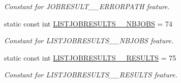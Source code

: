 \begin{DoxyCompactItemize}
\begin{DoxyCompactList}\small\item\em Constant for JOBRESULT\_\-\_\-ERRORPATH feature. \item\end{DoxyCompactList}\item 
\hypertarget{classTMS__Data_1_1TMS__DataPackage_ac68cd5ce0735ac6f33b68d9b6663269e}{
static const int \hyperlink{classTMS__Data_1_1TMS__DataPackage_ac68cd5ce0735ac6f33b68d9b6663269e}{LISTJOBRESULTS\_\-\_\-NBJOBS} = 74}
\label{classTMS__Data_1_1TMS__DataPackage_ac68cd5ce0735ac6f33b68d9b6663269e}

\begin{DoxyCompactList}\small\item\em Constant for LISTJOBRESULTS\_\-\_\-NBJOBS feature. \item\end{DoxyCompactList}\item 
\hypertarget{classTMS__Data_1_1TMS__DataPackage_a07b47ccffd7dac8cf1b4493213ddb32a}{
static const int \hyperlink{classTMS__Data_1_1TMS__DataPackage_a07b47ccffd7dac8cf1b4493213ddb32a}{LISTJOBRESULTS\_\-\_\-RESULTS} = 75}
\label{classTMS__Data_1_1TMS__DataPackage_a07b47ccffd7dac8cf1b4493213ddb32a}

\begin{DoxyCompactList}\small\item\em Constant for LISTJOBRESULTS\_\-\_\-RESULTS feature. \item\end{DoxyCompactList}\end{DoxyCompactItemize}
